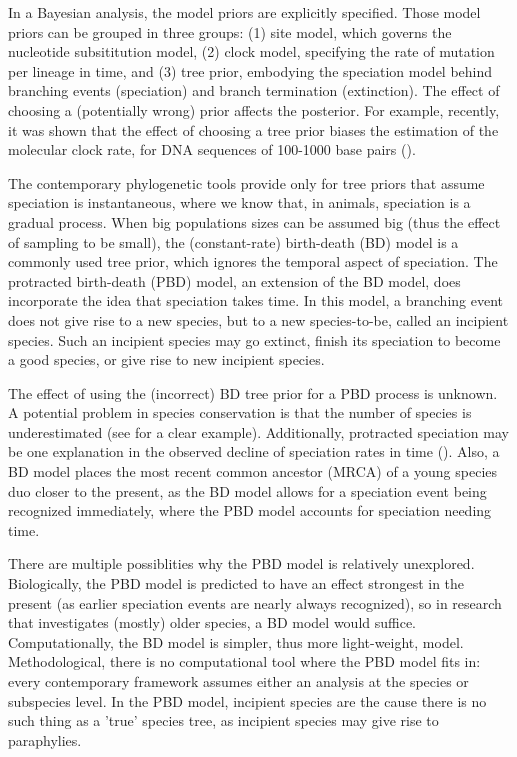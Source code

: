 \documentclass{article}
\begin{document}
In a Bayesian analysis, the model priors are explicitly specified.
Those model priors can be grouped in three groups: (1) site model, which
governs the nucleotide subsititution model, (2) clock model, specifying
the rate of mutation per lineage in time, and (3) tree prior, embodying
the speciation model behind branching events (speciation) 
and branch termination (extinction).
The effect of choosing a (potentially wrong) prior affects
the posterior. For example, recently, it was shown that the effect
of choosing a tree prior biases the estimation of the molecular clock rate, 
for DNA sequences of 100-1000 base pairs (\cite{moller2018}).

The contemporary phylogenetic tools provide only for tree priors 
that assume speciation is instantaneous, where we know that, 
in animals, speciation is a gradual process.
When big populations sizes can be assumed big (thus the effect of sampling to 
be small), the (constant-rate) birth-death (BD) model is a commonly 
used tree prior, which ignores the temporal aspect of speciation.
The protracted birth-death (PBD) model, an extension of 
the BD model, does incorporate the idea that speciation takes time.
In this model, a branching event does not give rise to a new species, but to
a new species-to-be, called an incipient species. Such an incipient
species may go extinct, finish its speciation to become a good species, or give
rise to new incipient species.

The effect of using the (incorrect) BD tree prior for a PBD process is unknown.
A potential problem in species conservation is that the number of 
species is underestimated (see \cite{fennessy2016} for a clear example). 
Additionally, protracted speciation may be one 
explanation in the observed decline of speciation rates in 
time (\cite{etienne2012}). Also, a BD model places the most recent common 
ancestor (MRCA) of a young species duo closer to the present, as the
BD model allows for a speciation event being recognized immediately,
where the PBD model accounts for speciation needing time.

There are multiple possiblities why the PBD model is relatively unexplored.
Biologically, the PBD model is predicted to have an effect strongest in
the present (as earlier speciation events are nearly always recognized),
so in research that investigates (mostly) older species, a BD model would suffice. 
Computationally, the BD model is simpler, thus more light-weight, model. 
Methodological, there is no computational tool where 
the PBD model fits in: every contemporary framework assumes 
either an analysis at the species or subspecies level. In the PBD
model, incipient species are the cause there is no such thing 
as a 'true' species tree, as incipient species may give rise to paraphylies.
\end{document}
